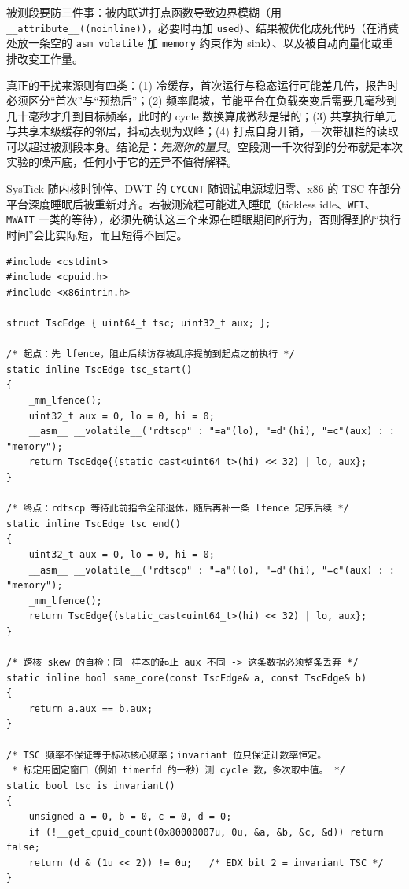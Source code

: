 \documentclass[12pt,a4paper,fontset=fandol]{ctexbook}
\newcommand{\Tp}[1]{\texttt{#1}}
\newcommand{\Bk}{\discretionary{}{}{}}
\begin{document}
被测段要防三件事：被内联进打点函数导致边界模糊（用 \Tp{\_{\Bk}\_{\Bk}attribute\_{\Bk}\_{\Bk}({\Bk}({\Bk}noinline))}，必要时再加 \Tp{used}）、结果被优化成死代码（在消费处放一条空的 \Tp{asm volatile} 加 \Tp{memory} 约束作为 sink）、以及被自动向量化或重排改变工作量。

真正的干扰来源则有四类：(1) 冷缓存，首次运行与稳态运行可能差几倍，报告时必须区分``首次''与``预热后''；(2) 频率爬坡，节能平台在负载突变后需要几毫秒到几十毫秒才升到目标频率，此时的 cycle 数换算成微秒是错的；(3) 共享执行单元与共享末级缓存的邻居，抖动表现为双峰；(4) 打点自身开销，一次带栅栏的读取可以超过被测段本身。结论是：\emph{先测你的量具}。空段测一千次得到的分布就是本次实验的噪声底，任何小于它的差异不值得解释。

\begin{note}[title={低功耗状态下的计数器不可信}]
SysTick 随内核时钟停、DWT 的 \Tp{CYCCNT} 随调试电源域归零、x86 的 TSC 在部分平台深度睡眠后被重新对齐。若被测流程可能进入睡眠（tickless idle、\Tp{WFI}、\Tp{MWAIT} 一类的等待），必须先确认这三个来源在睡眠期间的行为，否则得到的``执行时间''会比实际短，而且短得不固定。
\end{note}

\begin{lstlisting}[style=cppstyle,caption={x86 打点封装：起止定序、核号校验与不变性检查},label={lst:ch02-rdtscp}]
#include <cstdint>
#include <cpuid.h>
#include <x86intrin.h>

struct TscEdge { uint64_t tsc; uint32_t aux; };

/* 起点：先 lfence，阻止后续访存被乱序提前到起点之前执行 */
static inline TscEdge tsc_start()
{
    _mm_lfence();
    uint32_t aux = 0, lo = 0, hi = 0;
    __asm__ __volatile__("rdtscp" : "=a"(lo), "=d"(hi), "=c"(aux) : : "memory");
    return TscEdge{(static_cast<uint64_t>(hi) << 32) | lo, aux};
}

/* 终点：rdtscp 等待此前指令全部退休，随后再补一条 lfence 定序后续 */
static inline TscEdge tsc_end()
{
    uint32_t aux = 0, lo = 0, hi = 0;
    __asm__ __volatile__("rdtscp" : "=a"(lo), "=d"(hi), "=c"(aux) : : "memory");
    _mm_lfence();
    return TscEdge{(static_cast<uint64_t>(hi) << 32) | lo, aux};
}

/* 跨核 skew 的自检：同一样本的起止 aux 不同 -> 这条数据必须整条丢弃 */
static inline bool same_core(const TscEdge& a, const TscEdge& b)
{
    return a.aux == b.aux;
}

/* TSC 频率不保证等于标称核心频率；invariant 位只保证计数率恒定。
 * 标定用固定窗口（例如 timerfd 的一秒）测 cycle 数，多次取中值。 */
static bool tsc_is_invariant()
{
    unsigned a = 0, b = 0, c = 0, d = 0;
    if (!__get_cpuid_count(0x80000007u, 0u, &a, &b, &c, &d)) return false;
    return (d & (1u << 2)) != 0u;   /* EDX bit 2 = invariant TSC */
}
\end{lstlisting}
\end{document}
